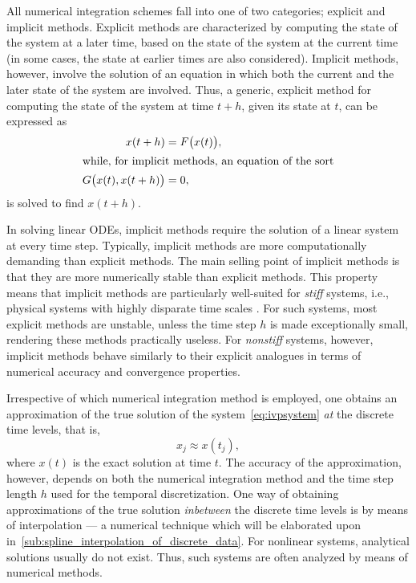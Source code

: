 All numerical integration schemes fall into one of two categories; explicit
and implicit methods. Explicit methods are characterized by computing the state
of the system at a later time, based on the state of the system at the current
time (in some cases, the state at earlier times are also considered). Implicit
methods, however, involve the solution of an equation in which both the
current and the later state of the system are involved. Thus, a generic,
explicit method for computing the state of the system at time $t+h$, given its
state at $t$, can be expressed as
\begin{subequations}
    \label{eq:exim}
    \begin{align}
        \label{eq:exim_ex}
        x(t+h) &= F\big(x(t)\big),\\
        \intertext{while, for implicit methods, an equation of the sort}
        \label{eq:exim_im}
        G\big(x(t),x(t+h)\big)&=0,
    \end{align}
\end{subequations}
is solved to find $x(t+h)$.

In solving linear ODEs, implicit methods require the solution of a linear
system at every time step. Typically, implicit methods are more computationally
demanding than explicit methods. The main selling point of implicit methods is
that they are more numerically stable than explicit methods. This property
means that implicit methods are particularly well-suited for \emph{stiff}
systems, i.e., physical systems with highly disparate time scales
\parencite[p.2]{hairer1996solving}. For such systems, most explicit methods are
unstable, unless the time step $h$ is made exceptionally small, rendering these
methods practically useless. For \emph{nonstiff} systems, however, implicit
methods behave similarly to their explicit analogues in terms of numerical
accuracy and convergence properties.

Irrespective of which numerical integration method is employed, one obtains
an approximation of the true solution of the system~\eqref{eq:ivpsystem}
\emph{at} the discrete time levels, that is,
\begin{equation}
    \label{eq:num_int_approx_sol}
    x_{j} \approx x(t_{j}),
\end{equation}
where $x(t)$ is the exact solution at time $t$. The accuracy of the
approximation, however, depends on both the numerical integration method and
the time step length $h$ used for the temporal discretization. One way
of obtaining approximations of the true solution \emph{inbetween} the discrete
time levels is by means of interpolation --- a numerical technique which will
be elaborated upon in~\cref{sub:spline_interpolation_of_discrete_data}. For
nonlinear systems, analytical solutions usually do not exist. Thus, such
systems are often analyzed by means of numerical methods.
